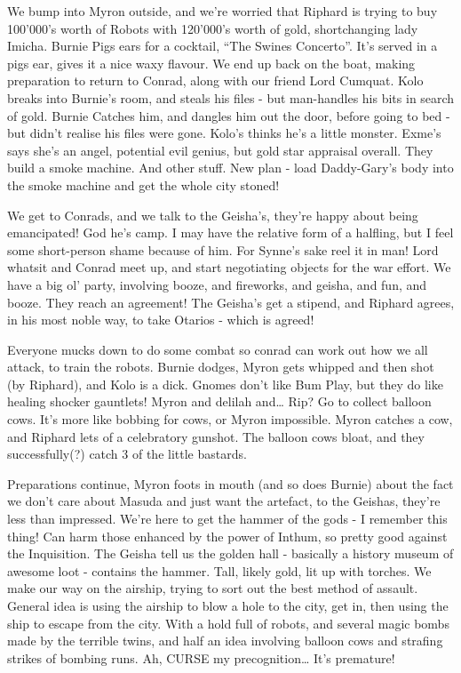 We bump into Myron outside, and we’re worried that Riphard is trying to buy 100’000’s worth of Robots with 120’000’s worth of gold, shortchanging lady Imicha. Burnie Pigs ears for a cocktail, “The Swines Concerto”. It’s served in a pigs ear, gives it a nice waxy flavour. We end up back on the boat, making preparation to return to Conrad, along with our friend Lord Cumquat. Kolo breaks into Burnie’s room, and steals his files - but man-handles his bits in search of gold. Burnie Catches him, and dangles him out the door, before going to bed - but didn’t realise his files were gone. Kolo’s thinks he’s a little monster. Exme’s says she’s an angel, potential evil genius, but gold star appraisal overall. They build a smoke machine. And other stuff. New plan - load Daddy-Gary’s body into the smoke machine and get the whole city stoned!\medskip

We get to Conrads, and we talk to the Geisha’s, they’re happy about being emancipated! God he’s camp. I may have the relative form of a halfling, but I feel some short-person shame because of him. For Synne’s sake reel it in man! Lord whatsit and Conrad meet up, and start negotiating objects for the war effort. We have a big ol’ party, involving booze, and fireworks, and geisha, and fun, and booze. They reach an agreement! The Geisha’s get a stipend, and Riphard agrees, in his most noble way, to take Otarios - which is agreed!\medskip

Everyone mucks down to do some combat so conrad can work out how we all attack, to train the robots. Burnie dodges, Myron gets whipped and then shot (by Riphard), and Kolo is a dick. Gnomes don’t like Bum Play, but they do like healing shocker gauntlets! Myron and delilah and… Rip? Go to collect balloon cows. It’s more like bobbing for cows, or Myron impossible. Myron catches a cow, and Riphard lets of a celebratory gunshot. The balloon cows bloat, and they successfully(?) catch 3 of the little bastards.\medskip

Preparations continue, Myron foots in mouth (and so does Burnie) about the fact we don’t care about Masuda and just want the artefact, to the Geishas, they’re less than impressed. We’re here to get the hammer of the gods - I remember this thing! Can harm those enhanced by the power of Inthum, so pretty good against the Inquisition. The Geisha tell us the golden hall - basically a history museum of awesome loot - contains the hammer. Tall, likely gold, lit up with torches. We make our way on the airship, trying to sort out the best method of assault. General idea is using the airship to blow a hole to the city, get in, then using the ship to escape from the city. With a hold full of robots, and several magic bombs made by the terrible twins, and half an idea involving balloon cows and strafing strikes of bombing runs. Ah, CURSE my precognition… It’s premature!\medskip

